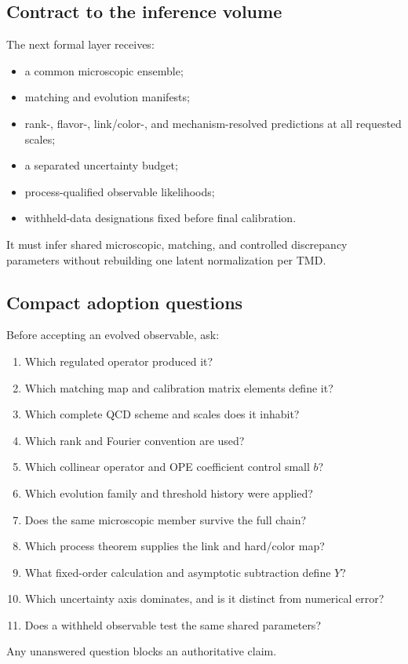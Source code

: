 \documentclass[11pt]{article}
\begin{document}
\subsection{Contract to the inference volume}

The next formal layer receives:
\begin{itemize}
\item a common microscopic ensemble;
\item matching and evolution manifests;
\item rank-, flavor-, link/color-, and mechanism-resolved predictions at all
      requested scales;
\item a separated uncertainty budget;
\item process-qualified observable likelihoods;
\item withheld-data designations fixed before final calibration.
\end{itemize}
It must infer shared microscopic, matching, and controlled discrepancy
parameters without rebuilding one latent normalization per TMD.

\subsection{Compact adoption questions}

Before accepting an evolved observable, ask:
\begin{enumerate}
\item Which regulated operator produced it?
\item Which matching map and calibration matrix elements define it?
\item Which complete QCD scheme and scales does it inhabit?
\item Which rank and Fourier convention are used?
\item Which collinear operator and OPE coefficient control small \(b\)?
\item Which evolution family and threshold history were applied?
\item Does the same microscopic member survive the full chain?
\item Which process theorem supplies the link and hard/color map?
\item What fixed-order calculation and asymptotic subtraction define \(Y\)?
\item Which uncertainty axis dominates, and is it distinct from numerical
      error?
\item Does a withheld observable test the same shared parameters?
\end{enumerate}
Any unanswered question blocks an authoritative claim.
\end{document}
